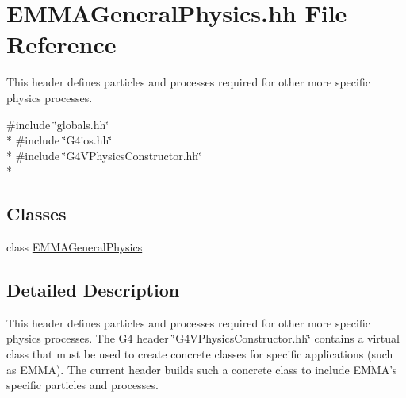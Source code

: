 \hypertarget{EMMAGeneralPhysics_8hh}{\section{E\-M\-M\-A\-General\-Physics.\-hh File Reference}
\label{EMMAGeneralPhysics_8hh}
}


This header defines particles and processes required for other more specific physics processes.  


{\ttfamily \#include \char`\"{}globals.\-hh\char`\"{}}\\*
{\ttfamily \#include \char`\"{}G4ios.\-hh\char`\"{}}\\*
{\ttfamily \#include \char`\"{}G4\-V\-Physics\-Constructor.\-hh\char`\"{}}\\*
\subsection*{Classes}
\begin{DoxyCompactItemize}
\item 
class \hyperlink{classEMMAGeneralPhysics}{E\-M\-M\-A\-General\-Physics}
\end{DoxyCompactItemize}


\subsection{Detailed Description}
This header defines particles and processes required for other more specific physics processes. The G4 header \char`\"{}\-G4\-V\-Physics\-Constructor.\-hh\char`\"{} contains a virtual class that must be used to create concrete classes for specific applications (such as E\-M\-M\-A). The current header builds such a concrete class to include E\-M\-M\-A's specific particles and processes. 